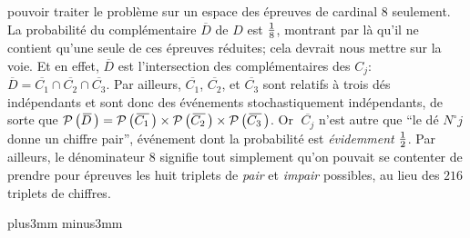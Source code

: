 pouvoir traiter le probl\`eme sur un espace des \'epreuves de cardinal 
$8$ seulement.  La probabilit\'e du compl\'ementaire $\overline{\! D}$ de
$D$ est ${1 \over 8}$,  montrant par l\`a qu'il ne contient qu'une seule de
ces \'epreuves r\'eduites;  cela devrait nous mettre sur la voie.  Et en
effet,  $\overline{\! D}$ est l'intersection des compl\'ementaires des
$C_j$:  $\overline{\! D} = \overline{\! C_1}\cap \overline{\! C_2} \cap 
\overline{\! C_3}$.  Par ailleurs, $\overline{\! C_1}$, $\overline{\! C_2}$, 
et $\overline{\! C_3}$ sont relatifs \`a trois d\'es ind\'ependants et sont 
donc des \'ev\'enements stochastiquement ind\'ependants,  de sorte que
${\cal P}\, \big(\,\overline{\! D}\,\big) = {\cal P}\, \big(\,\overline{\!
C_1}\,\big) \times {\cal P}\, \big(\,\overline{\! C_2}\,\big) \times 
{\cal P}\, \big(\,\overline{\! C_3}\,\big)$.  Or $\;\overline{\! C_j}$ n'est
autre que ``le d\'e $N^\circ j$ donne un chiffre pair'',  \'ev\'enement dont
la probabilit\'e est {\it \'evidemment} ${1\over 2}$.  Par ailleurs, le
d\'enominateur $8$ signifie tout simplement qu'on pouvait se contenter
de prendre pour \'epreuves les huit triplets de {\it pair} et {\it impair}
possibles,  au lieu des $216$ triplets de chiffres.

\vskip8mm plus3mm minus3mm


